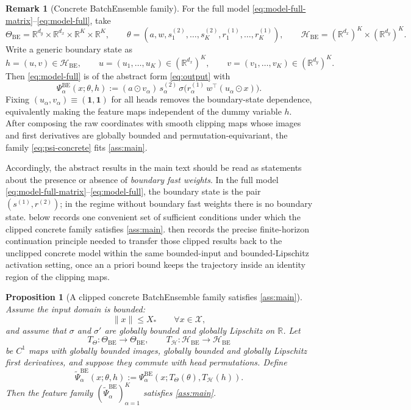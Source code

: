 \documentclass[11pt]{article}
\newtheorem{proposition}[theorem]{Proposition}
\theoremstyle{definition}
\newtheorem{remark}[theorem]{Remark}
\newcommand{\R}{\mathbb{R}}
\begin{document}
\begin{remark}[Concrete BatchEnsemble family]
\label{rem:concrete}
For the full model \eqref{eq:model-full-matrix}--\eqref{eq:model-full}, take
\[
  \Theta_{\mathrm{BE}}
  =
  \R^{d_y}\times\R^{d_x}\times\R^K\times\R^K,
  \qquad
  \theta=(a,w,s_1^{(2)},\dots,s_K^{(2)},r_1^{(1)},\dots,r_K^{(1)}),
  \qquad
  \mathcal H_{\mathrm{BE}}=(\R^{d_x})^K\times(\R^{d_y})^K.
\]
Write a generic boundary state as
\[
  h=(u,v)\in\mathcal H_{\mathrm{BE}},
  \qquad
  u=(u_1,\dots,u_K)\in(\R^{d_x})^K,
  \qquad
  v=(v_1,\dots,v_K)\in(\R^{d_y})^K.
\]
Then \eqref{eq:model-full} is of the abstract form \eqref{eq:output} with
\begin{equation}
  \Psi_\alpha^{\mathrm{BE}}(x;\theta,h)
  :=
  (a\odot v_\alpha)\,s_\alpha^{(2)}\,
  \sigma\!\bigl(r_\alpha^{(1)}\,w^\top(u_\alpha\odot x)\bigr).
  \label{eq:psi-concrete}
\end{equation}
Fixing $(u_\alpha,v_\alpha)\equiv(\mathbf 1,\mathbf 1)$ for all heads removes
the boundary-state dependence, equivalently making the feature maps independent of
the dummy variable $h$. After composing the raw coordinates with smooth
clipping maps whose images and first derivatives are globally bounded and
permutation-equivariant, the family \eqref{eq:psi-concrete} fits
\cref{ass:main}.
\par
Accordingly, the abstract results in the main text should be read as statements
about the presence or absence of \emph{boundary fast weights}. In the full
model \eqref{eq:model-full-matrix}--\eqref{eq:model-full}, the boundary state is
the pair $(s^{(1)},r^{(2)})$; in the regime without boundary fast weights there
is no boundary state.  below records one convenient
set of sufficient conditions under which the clipped concrete family satisfies
\cref{ass:main}.  then records the precise
finite-horizon continuation principle needed to transfer those clipped results
back to the unclipped concrete model within the same bounded-input and
bounded-Lipschitz activation setting, once an a priori bound keeps the
trajectory inside an identity region of the clipping maps.
\end{remark}

\begin{proposition}[A clipped concrete BatchEnsemble family satisfies \cref{ass:main}]
\label{prop:concrete-family}
Assume the input domain is bounded:
\[
  \|x\|\le X_*
  \qquad
  \forall x\in\mathcal X,
\]
and assume that $\sigma$ and $\sigma'$ are globally bounded and globally
Lipschitz on $\R$. Let
\[
  T_\Theta:\Theta_{\mathrm{BE}}\to\Theta_{\mathrm{BE}},
  \qquad
  T_\mathcal H:\mathcal H_{\mathrm{BE}}\to\mathcal H_{\mathrm{BE}}
\]
be $C^1$ maps with globally bounded images, globally bounded and globally
Lipschitz first derivatives, and suppose they commute with head permutations.
Define
\[
  \widetilde\Psi_\alpha^{\mathrm{BE}}(x;\theta,h)
  :=
  \Psi_\alpha^{\mathrm{BE}}(x;T_\Theta(\theta),T_\mathcal H(h)).
\]
Then the feature family
\(
  (\widetilde\Psi_\alpha^{\mathrm{BE}})_{\alpha=1}^K
\)
satisfies \cref{ass:main}.
\end{proposition}
\end{document}

